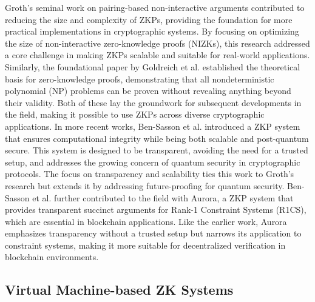 \documentclass{scrartcl}
\begin{document}
Groth’s\cite{Groth2016} seminal work on pairing-based non-interactive arguments contributed to reducing the size and complexity of ZKPs, providing the foundation for more practical implementations in cryptographic systems. By focusing on optimizing the size of non-interactive zero-knowledge proofs (NIZKs), this research addressed a core challenge in making ZKPs scalable and suitable for real-world applications. Similarly, the foundational paper by Goldreich et al.\cite{goldreich1991proofs} established the theoretical basis for zero-knowledge proofs, demonstrating that all nondeterministic polynomial (NP) problems can be proven without revealing anything beyond their validity. Both of these lay the groundwork for subsequent developments in the field, making it possible to use ZKPs across diverse cryptographic applications.
In more recent works, Ben-Sasson et al.\cite{ben2018scalable} introduced a ZKP system that ensures computational integrity while being both scalable and post-quantum secure. This system is designed to be transparent, avoiding the need for a trusted setup, and addresses the growing concern of quantum security in cryptographic protocols. The focus on transparency and scalability ties this work to Groth’s research but extends it by addressing future-proofing for quantum security. Ben-Sasson et al.\cite{ben2019aurora} further contributed to the field with Aurora, a ZKP system that provides transparent succinct arguments for Rank-1 Constraint Systems (R1CS), which are essential in blockchain applications. Like the earlier work, Aurora emphasizes transparency without a trusted setup but narrows its application to constraint systems, making it more suitable for decentralized verification in blockchain environments.

\subsection{Virtual Machine-based ZK Systems}
\end{document}
